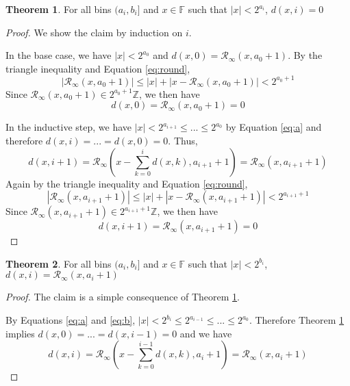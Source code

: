\documentclass[12pt]{article}
\providecommand{\F}{\ensuremath{\mathbb{F}}}
\providecommand{\Z}{\ensuremath{\mathbb{Z}}}
\providecommand{\roundtonearestinfty}{\ensuremath{\mathcal{R}_\text{$\infty$}}}
\theoremstyle{definition}
\newtheorem{thm}{Theorem}[section]
\numberwithin{equation}{section}
\begin{document}
    \begin{thm}
      For all bins $(a_i, b_i]$ and $x \in \F$ such that $|x| < 2^{a_i}$, $d(x, i) = 0$
      \label{thm:dzero}
    \end{thm}
    \begin{proof}
      We show the claim by induction on $i$.

      In the base case, we have $|x| < 2^{a_0}$ and $d(x, 0) = \roundtonearestinfty(x, a_0 + 1)$. By the triangle inequality and Equation \ref{eq:round},
      \begin{equation*}
        |\roundtonearestinfty(x, a_0 + 1)| \leq |x| + |x - \roundtonearestinfty(x, a_0 + 1)| < 2^{a_0 + 1}
      \end{equation*}
      Since $\roundtonearestinfty(x, a_0 + 1) \in 2^{a_0 + 1}\Z$, we then have
      \begin{equation*}
        d(x, 0) = \roundtonearestinfty(x, a_0 + 1) = 0
      \end{equation*}

      In the inductive step, we have $|x| < 2^{a_{i + 1}} \leq ... \leq 2^{a_0}$ by Equation \ref{eq:a} and therefore $d(x, i)= ... = d(x, 0) = 0$. Thus,
      \begin{equation*}
        d(x, i + 1) = \roundtonearestinfty(x - \sum\limits_{k = 0}^{i}d(x, k), a_{i + 1} + 1) = \roundtonearestinfty(x, a_{i+1} + 1)
      \end{equation*}
      Again by the triangle inequality and Equation \ref{eq:round},
      \begin{equation*}
        |\roundtonearestinfty(x, a_{i + 1} + 1)| \leq |x| + |x - \roundtonearestinfty(x, a_{i + 1} + 1)| < 2^{a_{i + 1} + 1}
      \end{equation*}
      Since $\roundtonearestinfty(x, a_{i + 1} + 1) \in 2^{a_{i + 1} + 1}\Z$, we then have
      \begin{equation*}
        d(x, i + 1) = \roundtonearestinfty(x, a_{i + 1} + 1) = 0
      \end{equation*}
    \end{proof}

    \begin{thm}
      For all bins $(a_i, b_i]$ and $x \in \F$ such that $|x| < 2^{b_i}$, $d(x, i) = \roundtonearestinfty(x, a_i + 1)$
      \label{thm:dmiddle}
    \end{thm}
    \begin{proof}
      The claim is a simple consequence of Theorem \ref{thm:dzero}.

      By Equations \ref{eq:a} and \ref{eq:b}, $|x| < 2^{b_i} \leq 2^{a_{i - 1}} \leq  ... \leq 2^{a_0}$. Therefore Theorem \ref{thm:dzero} implies $d(x, 0) = ... = d(x, i - 1) = 0$ and we have
      \begin{equation*}
        d(x, i) = \roundtonearestinfty(x - \sum\limits_{k = 0}^{i - 1}d(x, k), a_{i} + 1) = \roundtonearestinfty(x, a_{i} + 1)
      \end{equation*}
    \end{proof}
\end{document}
